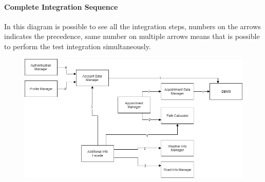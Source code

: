 \paragraph*{Complete Integration Sequence}
In this diagram is possible to see all the integration steps, numbers on the arrows indicates the precedence, same number on multiple arrows means that is possible to perform the test integration simultaneously.

\begin{figure}[h]
	\centering
	\includegraphics[width=\textwidth, keepaspectratio=true]{Img/IntegrationSequence}
\end{figure}